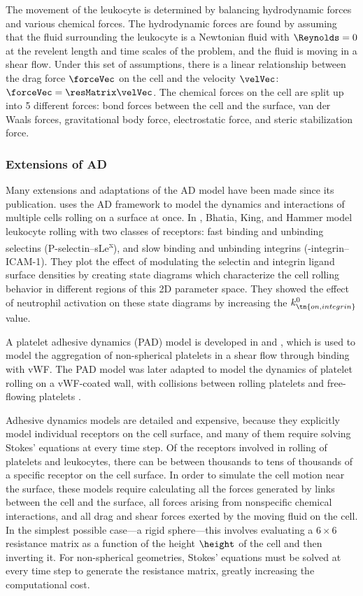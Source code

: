 The movement of the leukocyte is determined by balancing hydrodynamic
forces and various chemical forces. The hydrodynamic forces are found
by assuming that the fluid surrounding the leukocyte is a Newtonian
fluid with $\Reynolds = 0$ at the revelent length and time scales of
the problem, and the fluid is moving in a shear flow. Under this set
of assumptions, there is a linear relationship between the drag force
$\forceVec$ on the cell and the velocity $\velVec$: $\forceVec =
\resMatrix \velVec$. The chemical forces on the cell are split up into
5 different forces: bond forces between the cell and the surface, van
der Waals forces, gravitational body force, electrostatic force, and
steric stabilization force.

\subsubsection{Extensions of AD}
\label{sec:extensions-ad}

Many extensions and adaptations of the AD model have been made since
its publication. \cite{King2001} uses the AD framework to model the
dynamics and interactions of multiple cells rolling on a surface at
once. In \cite{Bhatia2003}, Bhatia, King, and Hammer model leukocyte
rolling with two classes of receptors: fast binding and unbinding
selectins (P-selectin--sLe\textsuperscript{x}), and slow binding and
unbinding integrins (-integrin--ICAM-1). They plot the effect
of modulating the selectin and integrin ligand surface densities by
creating state diagrams which characterize the cell rolling behavior
in different regions of this 2D parameter space. They showed the
effect of neutrophil activation on these state diagrams by increasing
the $k_\tn{on, integrin}^0$ value.

A platelet adhesive dynamics (PAD) model is developed in
\cite{Mody2008a} and \cite{Mody2008b}, which is used to model the
aggregation of non-spherical platelets in a shear flow through binding
with vWF. The PAD model was later adapted to model the dynamics of
platelet rolling on a vWF-coated wall, with collisions between rolling
platelets and free-flowing platelets \cite{Wang2013}.

Adhesive dynamics models are detailed and expensive, because they
explicitly model individual receptors on the cell surface, and many of
them require solving Stokes' equations at every time step. Of the
receptors involved in rolling of platelets and leukocytes, there can
be between thousands to tens of thousands of a specific receptor on
the cell surface. In order to simulate the cell motion near the
surface, these models require calculating all the forces generated by
links between the cell and the surface, all forces arising from
nonspecific chemical interactions, and all drag and shear forces
exerted by the moving fluid on the cell. In the simplest possible
case---a rigid sphere---this involves evaluating a $6 \times 6$
resistance matrix as a function of the height $\height$ of the cell
and then inverting it. For non-spherical geometries, Stokes' equations
must be solved at every time step to generate the resistance matrix,
greatly increasing the computational cost.

